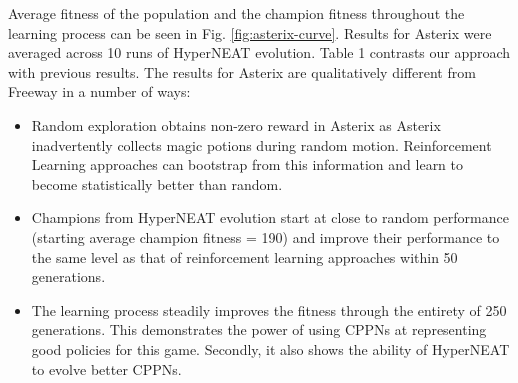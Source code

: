 \documentclass{acm_proc_article-sp}
\begin{document}
Average fitness of the population and the champion fitness throughout the learning process can be seen in Fig. \ref{fig:asterix-curve}. Results for Asterix were averaged across 10 runs of HyperNEAT evolution. Table 1 contrasts our approach with previous results. The results for Asterix are qualitatively different from Freeway in a number of ways:
\begin{itemize}
\item
Random exploration obtains non-zero reward in Asterix as Asterix inadvertently collects magic potions during random motion. Reinforcement Learning approaches can bootstrap from this information and learn to become statistically better than random.
\item
Champions from HyperNEAT evolution start at close to random performance (starting average champion fitness = 190) and improve their performance to the same level as that of reinforcement learning approaches within 50 generations. 
\item
The learning process steadily improves the fitness through the entirety of 250 generations. This demonstrates the power of using CPPNs at representing good policies for this game. Secondly, it also shows the ability of HyperNEAT to evolve better CPPNs.
\end{itemize}

\end{document}
